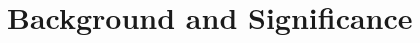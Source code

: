 \documentclass[../Dissertation]{subfiles}
\begin{document}
\section{Background and Significance}\label{sec:significance}
    \lipsum[1-3]
\end{document}
